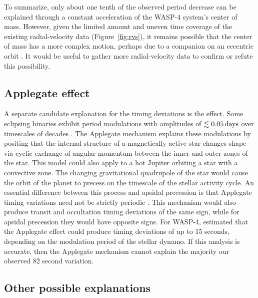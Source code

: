 \documentclass[12pt,twocolumn,tighten]{aastex62}
\begin{document}
{To summarize, only about one tenth of the observed period decrease can
be explained through a constant acceleration of the WASP-4 system's
center of mass.  However, given the limited amount and uneven time
coverage of the existing radial-velocity data (Figure~\ref{fig:rvs}),
it remains possible that the center of mass has a more complex motion,
perhaps due to a companion on an eccentric orbit \citep[{\it e.g.},
WASP-53 or WASP-81][]{triaud_peculiar_2017}.  It would be useful to
gather more radial-velocity data to confirm or refute this
possibility.


\subsection{Applegate effect}

A separate candidate explanation for the timing deviations is the
\citet{applegate_mechanism_1992} effect.  Some eclipsing binaries
exhibit period modulations with amplitudes of $\lesssim 0.05\,{\rm
days}$ over timescales of decades \citep[{\it
e.g.},][]{soderhjelm_geometry_1980,hall_relation_1989}.  The Applegate
mechanism explains these modulations by positing that the internal
structure of a magnetically active star changes shape via cyclic
exchange of angular momentum between the inner and outer zones of the
star.  This model could also apply to a hot Jupiter orbiting a star
with a convective zone.  The changing gravitational quadrupole of the
star would cause the orbit of the planet to precess on the timescale
of the stellar activity cycle.  An essential difference between this
process and apsidal precession is that Applegate timing variations
need not be strictly periodic \citep[{\it
e.g.},][Figure~12]{soderhjelm_geometry_1980}. This mechanism would
also produce transit and occultation timing deviations of the same
sign, while for apsidal precession they would have opposite signs.
For WASP-4, \citet{watson_orbital_2010} estimated that the Applegate
effect could produce timing deviations of up to 15 seconds, depending
on the modulation period of the stellar dynamo.  If this analysis is
accurate, then the Applegate mechanism cannot explain the majority our
observed $82$ second variation.


\subsection{Other possible explanations}

}
\end{document}
